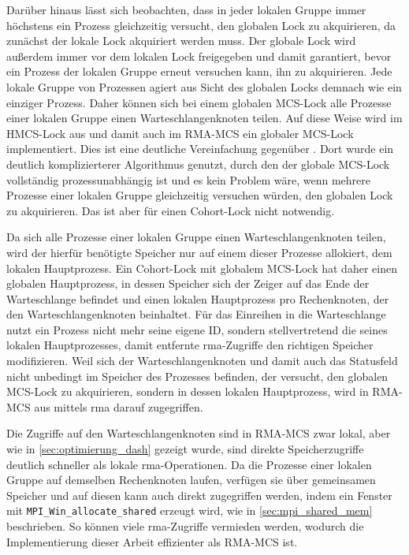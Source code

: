 Darüber hinaus lässt sich beobachten,
dass in jeder lokalen Gruppe immer höchstens ein Prozess gleichzeitig versucht,
den globalen Lock zu akquirieren,
da zunächst der lokale Lock akquiriert werden muss.
Der globale Lock wird außerdem immer vor dem lokalen Lock freigegeben
und damit garantiert,
bevor ein Prozess der lokalen Gruppe erneut versuchen kann,
ihn zu akquirieren.
Jede lokale Gruppe von Prozessen agiert aus Sicht des globalen Locks demnach wie ein einziger Prozess.
Daher können sich bei einem globalen MCS-Lock alle Prozesse einer lokalen Gruppe einen Warteschlangenknoten teilen.
Auf diese Weise wird im HMCS-Lock aus \cite{HMCS-Lock} und damit auch im RMA-MCS ein globaler MCS-Lock implementiert.
Dies ist eine deutliche Vereinfachung gegenüber \cite{Cohort-Lock}.
Dort wurde ein deutlich komplizierterer Algorithmus genutzt,
durch den der globale MCS-Lock vollständig prozessunabhängig ist
und es kein Problem wäre,
wenn mehrere Prozesse einer lokalen Gruppe gleichzeitig versuchen würden,
den globalen Lock zu akquirieren.
Das ist aber für einen Cohort-Lock nicht notwendig.

Da sich alle Prozesse einer lokalen Gruppe einen Warteschlangenknoten teilen,
wird der hierfür benötigte Speicher nur auf einem dieser Prozesse allokiert,
dem lokalen Hauptprozess.
Ein Cohort-Lock mit globalem MCS-Lock hat daher einen globalen Hauptprozess,
in dessen Speicher sich der Zeiger auf das Ende der Warteschlange befindet
und einen lokalen Hauptprozess pro Rechenknoten,
der den Warteschlangenknoten beinhaltet.
Für das Einreihen in die Warteschlange nutzt ein Prozess nicht mehr seine eigene ID,
sondern stellvertretend die seines lokalen Hauptprozesses,
damit entfernte \gls{rma}-Zugriffe den richtigen Speicher modifizieren.
Weil sich der Warteschlangenknoten und damit auch das Statusfeld nicht unbedingt im Speicher des Prozesses befinden,
der versucht,
den globalen MCS-Lock zu akquirieren,
sondern in dessen lokalen Hauptprozess,
wird in RMA-MCS aus \cite{RMA-RW} mittels \gls{rma} darauf zugegriffen.

Die Zugriffe auf den Warteschlangenknoten sind in RMA-MCS zwar lokal,
aber wie in \autoref{sec:optimierung_dash} gezeigt wurde,
sind direkte Speicherzugriffe deutlich schneller
als lokale \gls{rma}-Operationen.
Da die Prozesse einer lokalen Gruppe auf demselben Rechenknoten laufen,
verfügen sie über gemeinsamen Speicher
und auf diesen kann auch direkt zugegriffen werden,
indem ein \gls{Fenster} mit \texttt{MPI\_Win\_allocate\_shared} erzeugt wird,
wie in \autoref{sec:mpi_shared_mem} beschrieben.
So können viele \gls{rma}-Zugriffe vermieden werden,
wodurch die Implementierung dieser Arbeit effizienter
als RMA-MCS ist.

